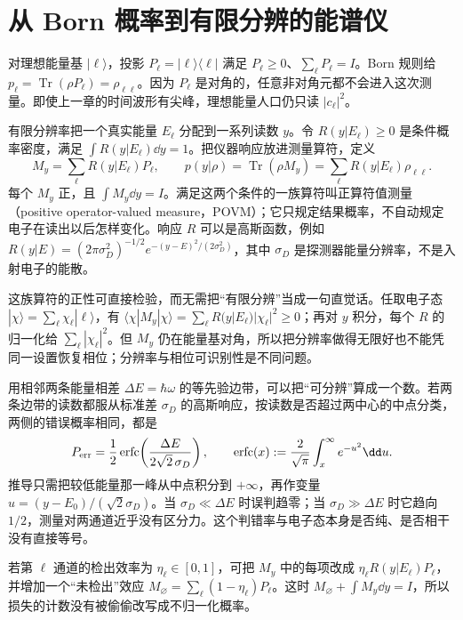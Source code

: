 \section{从 Born 概率到有限分辨的能谱仪}
\label{chap:feqo-measurement}

对理想能量基 \(|\ell\rangle\)，投影 \(P_\ell=|\ell\rangle\langle\ell|\) 满足 \(P_\ell\geq0\)、\(\sum_\ell P_\ell=I\)。Born 规则给 \(p_\ell=\operatorname{Tr}(\rho P_\ell)=\rho_{\ell\ell}\)。因为 \(P_\ell\) 是对角的，任意非对角元都不会进入这次测量。即使上一章的时间波形有尖峰，理想能量人口仍只读 \(|c_\ell|^2\)。

有限分辨率把一个真实能量 \(E_\ell\) 分配到一系列读数 \(y\)。令 \(R(y|E_\ell)\geq0\) 是条件概率密度，满足 \(\int R(y|E_\ell)\dd y=1\)。把仪器响应放进测量算符，定义
\begin{equation}
M_y=\sum_\ell R(y|E_\ell)P_\ell,
\qquad p(y|\rho)=\operatorname{Tr}(\rho M_y)
=\sum_\ell R(y|E_\ell)\rho_{\ell\ell}.
\label{eq:feqo-energy-povm}
\end{equation}
每个 \(M_y\) 正，且 \(\int M_y\dd y=I\)。满足这两个条件的一族算符叫正算符值测量（positive operator-valued measure，POVM）；它只规定结果概率，不自动规定电子在读出以后怎样变化。响应 \(R\) 可以是高斯函数，例如 \(R(y|E)=(2\pi\sigma_D^2)^{-1/2}e^{-(y-E)^2/(2\sigma_D^2)}\)，其中 \(\sigma_D\) 是探测器能量分辨率，不是入射电子的能散。

这族算符的正性可直接检验，而无需把“有限分辨”当成一句直觉话。任取电子态 \(|\chi\rangle=\sum_\ell\chi_\ell|\ell\rangle\)，有 \(\langle\chi|M_y|\chi\rangle=\sum_\ell R(y|E_\ell)|\chi_\ell|^2\geq0\)；再对 \(y\) 积分，每个 \(R\) 的归一化给 \(\sum_\ell|\chi_\ell|^2\)。但 \(M_y\) 仍在能量基对角，所以把分辨率做得无限好也不能凭同一设置恢复相位；分辨率与相位可识别性是不同问题。

用相邻两条能量相差 \(\Delta E=\hbar\omega\) 的等先验边带，可以把“可分辨”算成一个数。若两条边带的读数都服从标准差 \(\sigma_D\) 的高斯响应，按读数是否超过两中心的中点分类，两侧的错误概率相同，都是
\[
P_{\rm err}=\frac12\operatorname{erfc}
\!\left(\frac{\Delta E}{2\sqrt2\,\sigma_D}\right),
\qquad
\operatorname{erfc}(x):=\frac2{\sqrt\pi}\int_x^\infty e^{-u^2}\dd u.
\]
推导只需把较低能量那一峰从中点积分到 \(+\infty\)，再作变量 \(u=(y-E_0)/(\sqrt2\sigma_D)\)。当 \(\sigma_D\ll\Delta E\) 时误判趋零；当 \(\sigma_D\gg\Delta E\) 时它趋向 \(1/2\)，测量对两通道近乎没有区分力。这个判错率与电子态本身是否纯、是否相干没有直接等号。

若第 \(\ell\) 通道的检出效率为 \(\eta_\ell\in[0,1]\)，可把 \(M_y\) 中的每项改成 \(\eta_\ell R(y|E_\ell)P_\ell\)，并增加一个“未检出”效应 \(M_\varnothing=\sum_\ell(1-\eta_\ell)P_\ell\)。这时 \(M_\varnothing+\int M_y\dd y=I\)，所以损失的计数没有被偷偷改写成不归一化概率。

